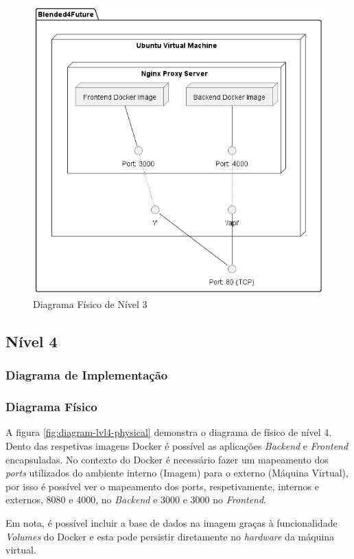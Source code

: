 \begin{figure}[h!tbp]
    \centering
    \includegraphics[width=0.7\linewidth]{capitulos/cap3-analisedoproblema/assets/arquiteturasistema/physical/physical_l3.png}
    \caption{Diagrama Físico de Nível 3}
    \label{fig:diagram-lvl3-physical}
\end{figure}





\subsection{Nível 4}

\subsubsection{Diagrama de Implementação}

\subsubsection{Diagrama Físico} 

A figura \ref{fig:diagram-lvl4-physical} demonstra o diagrama de físico de nível 4. Dento das respetivas imagens \gls{Docker} é possível as aplicações  \textit{Backend} e \textit{Frontend} encapsuladas. No contexto do \gls{Docker} é necessário fazer um mapeamento dos \textit{ports} utilizados do ambiente interno (Imagem) para o externo (Máquina Virtual), por isso é possível ver o mapeamento dos ports, respetivamente, internos e externos, 8080 e 4000, no \textit{Backend} e 3000 e 3000 no \textit{Frontend}.

Em nota, é possível incluir a base de dados na imagem graças à funcionalidade \textit{Volumes} do Docker e esta pode persistir diretamente no \textit{hardware} da máquina virtual.

